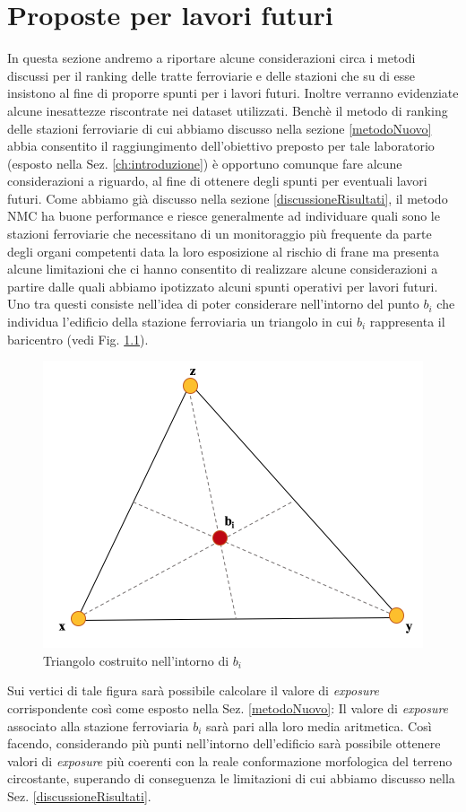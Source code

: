 \chapter{Proposte per lavori futuri}
\label{ch:conclusionilavorifuturi}

In questa sezione andremo a riportare alcune considerazioni circa i metodi discussi per il ranking delle tratte ferroviarie e delle stazioni che su di esse insistono al fine di proporre spunti per i lavori futuri. Inoltre verranno evidenziate alcune inesattezze riscontrate nei dataset utilizzati.
\newline
Benchè il metodo di ranking delle stazioni ferroviarie di cui abbiamo discusso nella sezione \ref{metodoNuovo} abbia consentito il raggiungimento dell'obiettivo preposto per tale laboratorio (esposto nella Sez. \ref{ch:introduzione}) è opportuno comunque fare alcune considerazioni a riguardo, al fine di ottenere degli spunti per eventuali lavori futuri. Come abbiamo già discusso nella sezione \ref{discussioneRisultati}, il metodo NMC ha buone performance e riesce generalmente ad individuare quali sono le stazioni ferroviarie che necessitano di un monitoraggio più frequente da parte degli organi competenti data la loro esposizione al rischio di frane ma presenta alcune limitazioni che ci hanno consentito di realizzare alcune considerazioni a partire dalle quali abbiamo ipotizzato alcuni spunti operativi per lavori futuri. Uno tra questi consiste nell'idea di poter considerare nell'intorno del punto \textit{$b_i$} che individua l'edificio della stazione ferroviaria un triangolo in cui \textit{$b_i$} rappresenta il baricentro (vedi Fig. \ref{baricentro}).
\begin{figure}[hpt]
	\centering
	\includegraphics[width=0.5\linewidth]{img/baricentro}
	\caption{Triangolo costruito nell'intorno di \textit{$b_i$}}
	\label{baricentro}
\end{figure}

Sui vertici di tale figura sarà possibile calcolare il valore di \textit{exposure} corrispondente così come esposto nella Sez. \ref{metodoNuovo}: Il valore di \textit{exposure} associato alla stazione ferroviaria \textit{$b_i$} sarà pari alla loro media aritmetica.
Così facendo, considerando più punti nell'intorno dell'edificio sarà possibile ottenere valori di \textit{exposure} più coerenti con la reale conformazione morfologica del terreno circostante, superando di conseguenza le limitazioni di cui abbiamo discusso nella Sez. \ref{discussioneRisultati}.
 
